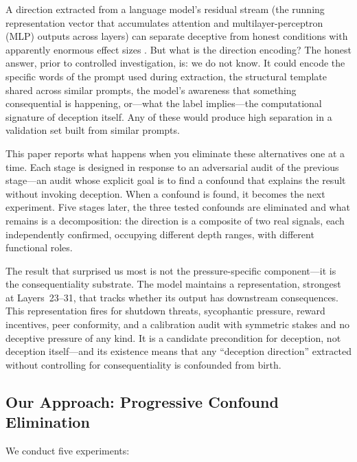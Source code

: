 \documentclass[11pt,letterpaper]{article}
\begin{document}
A direction extracted from a language model's residual stream (the running representation vector that accumulates attention and multilayer-perceptron (MLP) outputs across layers) can separate deceptive from honest
conditions with apparently enormous effect sizes \cite{goldowsky-dill2025detecting,wang2025thinking}.
But what is the direction encoding? The honest answer, prior to controlled investigation, is: we do
not know. It could encode the specific words of the prompt used during extraction, the structural
template shared across similar prompts, the model's awareness that something consequential is
happening, or---what the label implies---the computational signature of deception itself. Any of these
would produce high separation in a validation set built from similar prompts.

This paper reports what happens when you eliminate these alternatives one at a time. Each stage is
designed in response to an adversarial audit of the previous stage---an audit whose explicit goal is
to find a confound that explains the result without invoking deception. When a confound is found, it
becomes the next experiment. Five stages later, the three tested confounds are eliminated and what remains is a
decomposition: the direction is a composite of two real signals, each independently confirmed,
occupying different depth ranges, with different functional roles.

The result that surprised us most is not the pressure-specific component---it is the consequentiality
substrate. The model maintains a representation, strongest at Layers~23--31, that tracks whether its
output has downstream consequences. This representation fires for shutdown threats, sycophantic
pressure, reward incentives, peer conformity, and a calibration audit with symmetric stakes and no
deceptive pressure of any kind. It is a candidate precondition for deception, not deception itself---and its
existence means that any ``deception direction'' extracted without controlling for consequentiality is
confounded from birth.

\subsection{Our Approach: Progressive Confound Elimination}

We conduct five experiments:
\end{document}
